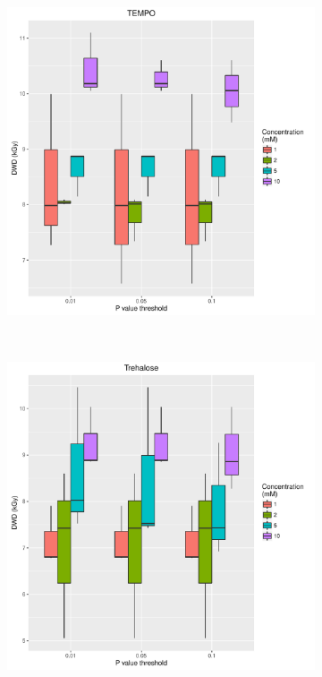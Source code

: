 \begin{figure}
\begin{subfigure}[b]{0.75\textwidth}
            \caption{}
            \label{}
    \end{subfigure}
\end{figure}
\begin{figure}
    \ContinuedFloat
    \begin{subfigure}[b]{0.75\textwidth}
            \centering
            \includegraphics[width=\textwidth]{figures/saxs/TEMPO_PThresh_comp.pdf}
            \caption{}
            \label{}
    \end{subfigure}
    \\
    \begin{subfigure}[b]{0.75\textwidth}
            \centering
            \includegraphics[width=\textwidth]{figures/saxs/Trehalose_PThresh_comp.pdf}

\end{subfigure}
\end{figure}
